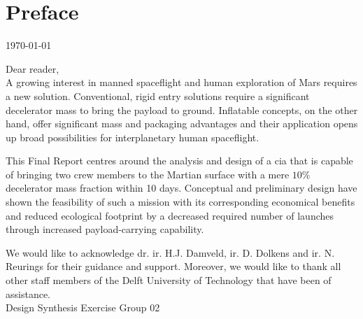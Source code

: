 \section*{Preface}\label{cha:preface}

\begin{flushright}
	\today
\end{flushright}

Dear reader,	
\\ [1cm]
A growing interest in manned spaceflight and human exploration of Mars requires a new solution. Conventional, rigid entry solutions require a significant decelerator mass to bring the payload to ground. Inflatable concepts, on the other hand, offer significant mass and packaging advantages and their application opens up broad possibilities for interplanetary human spaceflight. 

This Final Report centres around the analysis and design of a \acrlong{cia} that is capable of bringing two crew members to the Martian surface with a mere $10\%$ decelerator mass fraction within 10 days. Conceptual and preliminary design have shown the feasibility of such a mission with its corresponding economical benefits and reduced ecological footprint by a decreased required number of launches through increased payload-carrying capability.

We would like to acknowledge dr. ir. H.J. Damveld, ir. D. Dolkens and ir. N. Reurings for their guidance and support. Moreover, we would like to thank all other staff members of the Delft University of Technology that have been of assistance.
\\ [1.5cm]
Design Synthesis Exercise Group 02
